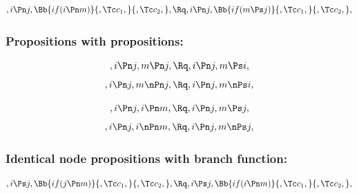 \bigskip
\bigskip
\[,i \Pn j, \Bb{if(i \Pn m)}{,\Tc c_1,}{,\Tc c_2,}, \Rq ,i \Pn j, \Bb{if(m \Ps j)}{,\Tc c_1,}{,\Tc c_2,}, \]


\bigskip
\bigskip
\bigskip
\bigskip
\subsubsection{Propositions with propositions:}
\[,i \Pn j, m \Pn j, \Rq , i \Pn j, m \Ps i,\]
\[,i \Pn j, m \nPn j, \Rq , i \Pn j, m \nPs i,\]

\[,i \Pn j, i \Pn m, \Rq , i \Pn j, m \Ps j,\]
\[,i \Pn j, i \nPn m, \Rq , i \Pn j, m \nPs j,\]

\bigskip
\bigskip
\bigskip
\bigskip
\subsubsection{Identical node propositions with  branch function:}
\[,i \Ps j, \Bb{if(j \Pn m)}{,\Tc c_1,}{,\Tc c_2,}, \Rq ,i \Ps j, \Bb{if(i \Pn m)}{,\Tc c_1,}{,\Tc c_2,}, \]

